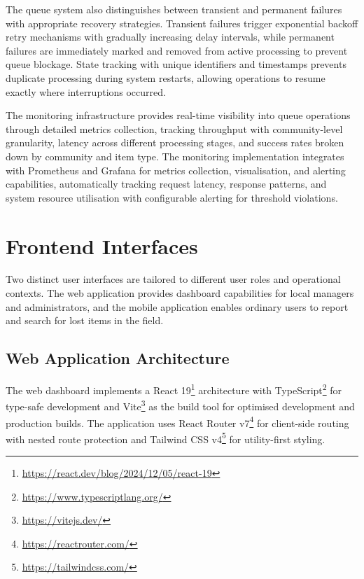 The queue system also distinguishes between transient and permanent failures with appropriate recovery strategies. Transient failures trigger exponential backoff retry mechanisms with gradually increasing delay intervals, while permanent failures are immediately marked and removed from active processing to prevent queue blockage. State tracking with unique identifiers and timestamps prevents duplicate processing during system restarts, allowing operations to resume exactly where interruptions occurred.

The monitoring infrastructure provides real-time visibility into queue operations through detailed metrics collection, tracking throughput with community-level granularity, latency across different processing stages, and success rates broken down by community and item type. The monitoring implementation integrates with Prometheus and Grafana for metrics collection, visualisation, and alerting capabilities, automatically tracking request latency, response patterns, and system resource utilisation with configurable alerting for threshold violations.



\section{Frontend Interfaces} \label{section:frontend_interfaces}

Two distinct user interfaces are tailored to different user roles and operational contexts. The web application provides dashboard capabilities for local managers and administrators, and the mobile application enables ordinary users to report and search for lost items in the field.

\subsection{Web Application Architecture} \label{subsection:web_application}

The web dashboard implements a React 19\footnote{\url{https://react.dev/blog/2024/12/05/react-19}} architecture with TypeScript\footnote{\url{https://www.typescriptlang.org/}} for type-safe development and Vite\footnote{\url{https://vitejs.dev/}} as the build tool for optimised development and production builds. The application uses React Router v7\footnote{\url{https://reactrouter.com/}} for client-side routing with nested route protection and Tailwind CSS v4\footnote{\url{https://tailwindcss.com/}} for utility-first styling.

